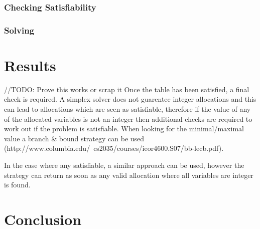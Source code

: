 \documentclass{report}
\begin{document}
\subsection {Checking Satisfiability}
\subsection {Solving}
\chapter {Results}

//TODO: Prove this works or scrap it
Once the table has been satisfied, a final check is required. A simplex solver does not guarentee integer allocations and this can lead to allocations which are seen as satisfiable, therefore if the value of any of the allocated variables is not an integer then additional checks are required to work out if the problem is satisfiable.
When looking for the minimal/maximal value a branch & bound strategy can be used (http://www.columbia.edu/~cs2035/courses/ieor4600.S07/bb-lecb.pdf).

In the case where any satisfiable, a similar approach can be used, however the strategy can return as soon as any valid allocation where all variables are integer is found.

\chapter {Conclusion}
\end{document}
